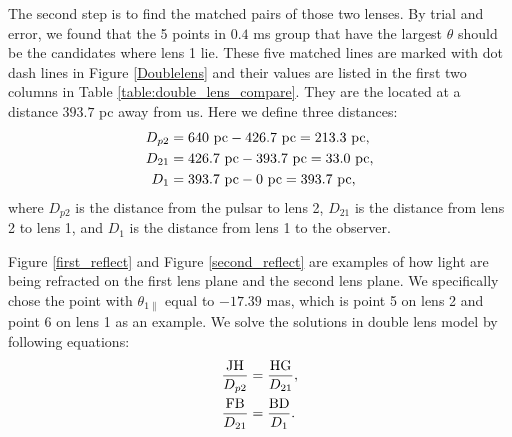 \documentclass[useAMS,usenatbib]{mn2e}
\begin{document}
The second step is to find the matched pairs of those two lenses. By trial and error, we found that the 5 points in $0.4$ ms group that have the largest $\theta$ should be the candidates where lens 1 lie.  These five matched lines are marked with dot dash lines in Figure \ref{Doublelens} and their values are listed in the first two columns in Table \ref{table:double_lens_compare}. They are the located at a distance $393.7$ pc away from us. Here we define three distances:
\begin{equation}
\begin{aligned}
D_{p2}&=640~{\rm pc}-426.7~{\rm pc} =213.3~{\rm pc},\\
D_{21}&=426.7~{\rm pc}-393.7~{\rm pc} =33.0~{\rm pc},\\
D_{1}&=393.7~{\rm pc}- 0~{\rm pc} = 393.7~{\rm pc}, 
\end{aligned} 
\end{equation}
where $D_{p2}$ is the distance from the pulsar to lens 2, $D_{21}$ is the distance from lens 2 to lens 1, and $D_{1}$ is the distance from lens 1 to the observer.

Figure \ref{first_reflect} and Figure \ref{second_reflect} are examples of how light are being refracted on the first lens plane and the second lens plane. We specifically chose the point with $\theta_{1\parallel}$ equal to $-17.39$ mas, which is point 5 on lens 2 and point 6 on lens 1 as an example. We solve the solutions in double lens model by following equations:
\begin{equation}
\begin{aligned}
\frac{\rm JH}{D_{p2}}&=\frac{\rm HG}{D_{21}},\\
\frac{\rm FB}{D_{21}}&=\frac{\rm BD}{D_{1}}.
\end{aligned}
\end{equation}
\end{document}
